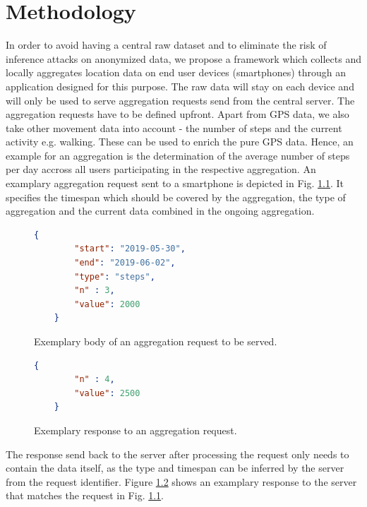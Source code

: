 \chapter{Methodology}\label{chapter:method}
In order to avoid having a central raw dataset and to eliminate the risk of inference attacks on anonymized data, we propose a framework which collects and locally aggregates location data on end user devices (smartphones) through an application designed for this purpose. The raw data will stay on each device and will only be used to serve aggregation requests send from the central server. The aggregation requests have to be defined upfront. Apart from GPS data, we also take other movement data into account - the number of steps and the current activity e.g. walking. These can be used to enrich the pure GPS data. Hence, an example for an aggregation is the determination of the average number of steps per day accross all users participating in the respective aggregation. An examplary aggregation request sent to a smartphone is depicted in Fig. \ref{incoming-aggregation-request}. It specifies the timespan which should be covered by the aggregation, the type of aggregation and the current data combined in the ongoing aggregation.

\begin{figure}[h!]
	\begin{lstlisting}[language=json,firstnumber=1]
	{
		"start": "2019-05-30",
		"end": "2019-06-02",
		"type": "steps",
		"n" : 3,
		"value": 2000
	}
	\end{lstlisting}
	\caption{Exemplary body of an aggregation request to be served.}
	\label{incoming-aggregation-request}
\end{figure}

\begin{figure}[h!]
	\begin{lstlisting}[language=json,firstnumber=1]
	{
		"n" : 4,
		"value": 2500
	}
	\end{lstlisting}
	\caption{Exemplary response to an aggregation request.}
	\label{outgoing-aggregation-response}
\end{figure}

The response send back to the server after processing the request only needs to contain the data itself, as the type and timespan can be inferred by the server from the request identifier. Figure \ref{outgoing-aggregation-response} shows an examplary response to the server that matches the request in Fig. \ref{incoming-aggregation-request}.


